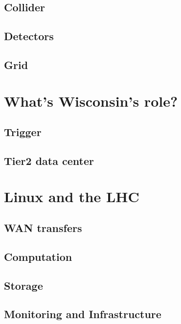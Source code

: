\documentclass[c]{beamer}
\begin{document}
\subsection{Collider}
\subsection{Detectors}
\subsection{Grid}

\section{What's Wisconsin's role?}
\subsection{Trigger}
\subsection{Tier2 data center}

\section{Linux and the LHC}
\subsection{WAN transfers}
\subsection{Computation}
\subsection{Storage}
\subsection{Monitoring and Infrastructure}
\end{document}
